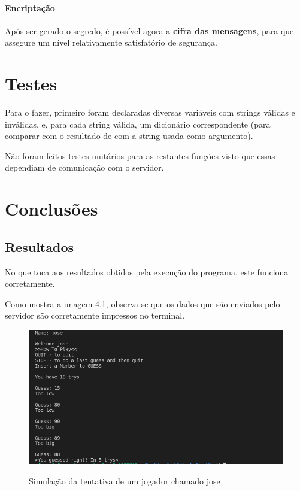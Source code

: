 \documentclass{report}
\begin{document}
\subsubsection{Encriptação}
Após ser gerado o segredo, é possível agora a \textbf{cifra das mensagens}, para que assegure um nível relativamente satisfatório de segurança.



\chapter{Testes}
\label{chap.testes}

Para o fazer, primeiro foram declaradas diversas variáveis com strings válidas e inválidas, e, para cada string válida, um dicionário correspondente (para comparar com o resultado de com a string usada como argumento).\newline


Não foram feitos testes unitários para as restantes funções visto que essas dependiam de comunicação com o servidor.





\chapter{Conclusões}
\label{chap.conclusao}
\section{Resultados}
No que toca aos resultados obtidos pela execução do programa, este funciona corretamente.\newline

Como mostra a imagem 4.1, observa-se que os dados que são enviados pelo servidor são corretamente impressos no terminal.

\begin{figure}[h]
\center
\includegraphics[scale=0.49]{teste1}
\label{pog}
\caption{Simulação da tentativa de um jogador chamado jose}
\end{figure}
\end{document}
